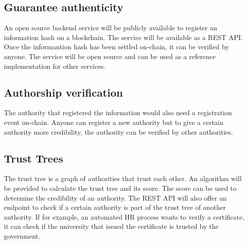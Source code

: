 \documentclass[../ockr-specification.tex]{subfiles}
\begin{document}
\subsection{Guarantee authenticity}

An open source backend service will be publicly available to register an information hash on a blockchain. The service will be available as a REST API. Once the informantion hash has been settled on-chain, it can be verified by anyone. The service will be open source and can be used as a reference implementation for other services.

\subsection{Authorship verification}

The authority that registered the information would also need a registration event on-chain. Anyone can register a new authority but to give a certain authority more credibility, the authority can be verified by other authorities.

\subsection{Trust Trees}

The trust tree is a graph of authorities that trust each other. An algorithm will be provided to calculate the trust tree and its score. The score can be used to determine the credibility of an authority. The REST API will also offer an endpoint to check if a certain authority is part of the trust tree of another authority. If for example, an automated HR process wants to verify a certificate, it can check if the university that issued the certificate is trusted by the government.

\newpage
\end{document}

